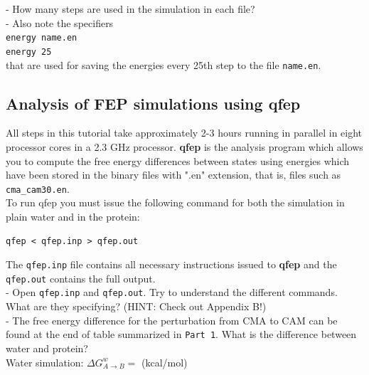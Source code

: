 \documentclass[10pt,oneside,pdftex]{article}
\begin{document}
- How many steps are used in the simulation in each file?\\

- Also note the specifiers\\

\noindent \texttt{energy \hspace{2cm}             name.en}\\
\texttt{energy  \hspace{2cm}                 25}\\

\noindent that are used for saving the energies every 25th step to
the file \texttt{name.en}.
\newpage

\subsection{Analysis of FEP simulations using \textbf{qfep}}
All steps  in this  tutorial take approximately  2-3 hours  running in
parallel  in   eight  processor   cores  in   a  2.3   GHz  processor.
\textbf{qfep} is the analysis program  which allows you to compute the
free energy differences between states  using energies which have been
stored in the  binary files with ".en" extension, that  is, files such
as \texttt{cma\_cam30.en}.\\
To  run  qfep you  must  issue  the  following  command for  both  the
simulation in plain water and in the protein:

\begin{Verbatim}
qfep < qfep.inp > qfep.out
\end{Verbatim}

The \texttt{qfep.inp} file contains all necessary instructions issued
to \textbf{qfep} and the \texttt{qfep.out} contains the full output.\\

- Open \texttt{qfep.inp} and \texttt{qfep.out}. 
Try to understand the different commands.
What are they specifying? (HINT: Check out Appendix B!)\\

- The free energy difference for  the perturbation from CMA to CAM can
be found at  the end of table summarized in  \texttt{Part 1}.  What is
the difference between water and protein?\\

Water simulation: $\Delta G_{A \rightarrow B}^w=$ \hspace{2cm} (kcal/mol)\\
\end{document}
